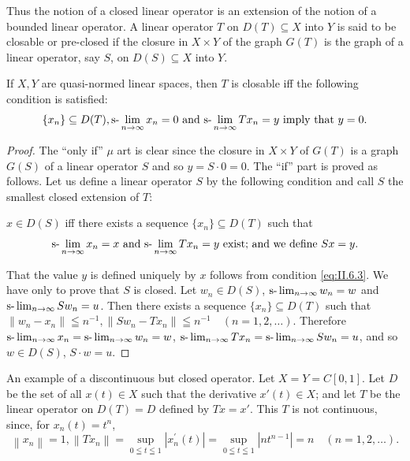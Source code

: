 Thus the notion of a closed linear operator is an extension of the notion of a bounded linear operator. A linear operator $T$ on $D(T) \subseteq X$ into $Y$ is said to be closable or pre-closed if the closure in $X \times Y$ of the graph $G(T)$ is the graph of a linear operator, say $S$, on $D(S) \subseteq X$ into $Y$. 

\begin{proposition}\label{prop:II.6.Proposition.2} If $X, Y$ are quasi-normed linear spaces, then $T$ is closable iff the following condition is satisfied: 
\begin{equation}\label{eq:II.6.3}
\{x _{n} \} \subseteq D (T), \text{s-}\lim _{n \rightarrow \infty} x _{n} = 0 \text{ and } \text{s-}\lim _{n \rightarrow \infty} T x _{n} = y \text{ imply that } y = 0.
\end{equation}
\end{proposition}

\begin{proof}
 The ``only if'' $\mu$ art is clear since the closure in $X \times Y$ of $G(T)$ is a graph $G(S)$ of a linear operator $S$ and so $y = S \cdot 0 = 0$. The ``if'' part is proved as follows. Let us define a linear operator $S$ by the following condition and call $S$ the smallest closed extension of $T$: 

$x \in D(S)$ iff there exists a sequence $\{x_n\} \subseteq D(T)$ such that 
\begin{equation}\text{s-}\lim _{n \to \infty} x _{n} = x \text{ and } \text{s-}\lim _{n \to \infty} T x _{n} = y \text{ exist; and we define } S x = y. \label{eq:II.6.4}\end{equation}

That the value $y$ is defined uniquely by $x$ follows from condition \eqref{eq:II.6.3}. We have only to prove that $S$ is closed. Let $w_{n} \in D(S)$, $\text{s-}\lim\nolimits_{n \to \infty} w_{n} = w$ and $\text{s-}\lim\nolimits_{n \to \infty} Sw_{n} = u$. Then there exists a sequence $\{x_{n}\} \subseteq D(T)$ such that $\| w_{n} - x_{n} \| \leqq n^{-1}, \| Sw_{n} - Tx_{n} \| \leqq n^{-1} \quad (n = 1, 2, \ldots)$. Therefore $\text{s-}\lim\nolimits_{n \to \infty} x_{n} = \text{s-}\lim\nolimits_{n \to \infty} w_{n} = w$, $\text{s-}\lim\nolimits_{n \to \infty} Tx_{n} = \text{s-}\lim\nolimits_{n \to \infty} Sw_{n} = u$, and so $w \in D(S)$, $S \cdot w = u$. 
\end{proof}

An example of a discontinuous but closed operator. Let $X = Y = C[0, 1]$. Let $D$ be the set of all $x(t) \in X$ such that the derivative $x'(t) \in X$; and let $T$ be the linear operator on $D(T) = D$ defined by $Tx = x'$. This $T$ is not continuous, since, for $x_n(t) = t^n$, 
\[
\left\| x _{n} \right\| = 1, \left\| T x _{n} \right\| = \sup\limits _{0 \leqq t \leqq 1} \left| x _{n} ^{\prime} (t) \right| = \sup\limits _{0 \leqq t \leqq 1} \left| n t ^{n-1} \right| = n \quad (n = 1, 2, \dots).
\]

